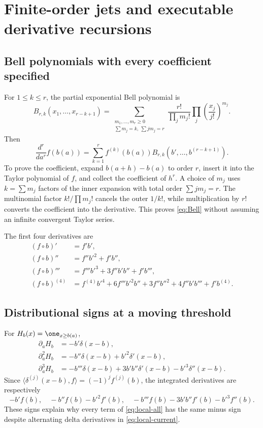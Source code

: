 \section{Finite-order jets and executable derivative recursions}\label{app:jets}
\subsection{Bell polynomials with every coefficient specified}
For $1\le k\le r$, the partial exponential Bell polynomial is
\begin{equation}
 B_{r,k}(x_1,\ldots,x_{r-k+1})
 =\sum_{\substack{m_1,\ldots,m_r\ge0\\\sum m_j=k,\ \sum jm_j=r}}
 \frac{r!}{\prod_jm_j!}\prod_j\left(\frac{x_j}{j!}\right)^{m_j}.
 \label{eq:Bell}
\end{equation}
Then
\[
 \frac{d^r}{da^r}f(b(a))
 =\sum_{k=1}^rf^{(k)}(b(a))B_{r,k}(b',\ldots,b^{(r-k+1)}).
\]
To prove the coefficient, expand $b(a+h)-b(a)$ to order $r$, insert it into the Taylor polynomial of $f$, and collect the coefficient of $h^r$. A choice of $m_j$ uses $k=\sum m_j$ factors of the inner expansion with total order $\sum jm_j=r$. The multinomial factor $k!/\prod m_j!$ cancels the outer $1/k!$, while multiplication by $r!$ converts the coefficient into the derivative. This proves \eqref{eq:Bell} without assuming an infinite convergent Taylor series.

The first four derivatives are
\begin{align*}
 (f\circ b)'&=f'b',\\
 (f\circ b)''&=f''b'^2+f'b'',\\
 (f\circ b)'''&=f'''b'^3+3f''b'b''+f'b''',\\
 (f\circ b)^{(4)}&=f^{(4)}b'^4+6f'''b'^2b''+3f''b''^2
 +4f''b'b'''+f'b^{(4)}.
\end{align*}

\subsection{Distributional signs at a moving threshold}
For $H_b(x)=\one_{x\ge b(a)}$,
\begin{align*}
 \partial_aH_b&=-b'\delta(x-b),\\
 \partial_a^2H_b&=-b''\delta(x-b)+b'^2\delta'(x-b),\\
 \partial_a^3H_b&=-b'''\delta(x-b)+3b'b''\delta'(x-b)-b'^3\delta''(x-b).
\end{align*}
Since $\langle\delta^{(j)}(x-b),f\rangle=(-1)^jf^{(j)}(b)$, the integrated derivatives are respectively
\[
 -b'f(b),\quad -b''f(b)-b'^2f'(b),\quad
 -b'''f(b)-3b'b''f'(b)-b'^3f''(b).
\]
These signs explain why every term of \eqref{eq:local-all} has the same minus sign despite alternating delta derivatives in \eqref{eq:local-current}.

